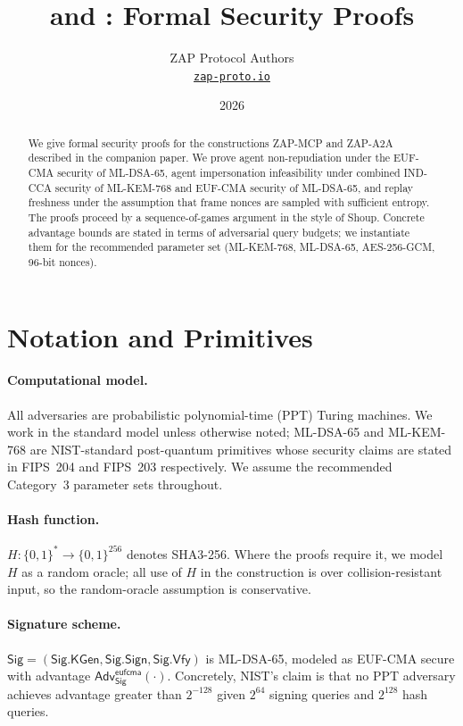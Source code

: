 \documentclass[11pt,a4paper]{article}
\title{\textbf{\zapmcp{} and \zapaa{}: Formal Security Proofs}}
\author{ZAP Protocol Authors\\
\href{https://zap-proto.io}{\texttt{zap-proto.io}}}
\date{2026}
\theoremstyle{definition}
\theoremstyle{remark}
\newcommand{\zapmcp}{\textsf{ZAP-MCP}\xspace}
\newcommand{\zapaa}{\textsf{ZAP-A2A}\xspace}
\newcommand{\Adv}{\mathsf{Adv}}
\newcommand{\Sign}{\textsf{Sig}}
\begin{document}
\maketitle

\begin{abstract}
We give formal security proofs for the constructions \zapmcp{} and
\zapaa{} described in the companion paper. We prove agent
non-repudiation under the EUF-CMA security of ML-DSA-65, agent
impersonation infeasibility under combined IND-CCA security of
ML-KEM-768 and EUF-CMA security of ML-DSA-65, and replay freshness
under the assumption that frame nonces are sampled with sufficient
entropy. The proofs proceed by a sequence-of-games argument in the
style of Shoup. Concrete advantage bounds are stated in terms of
adversarial query budgets; we instantiate them for the recommended
parameter set (ML-KEM-768, ML-DSA-65, AES-256-GCM, 96-bit nonces).
\end{abstract}

\section{Notation and Primitives}

\paragraph{Computational model.} All adversaries are probabilistic
polynomial-time (PPT) Turing machines. We work in the standard model
unless otherwise noted; ML-DSA-65 and ML-KEM-768 are NIST-standard
post-quantum primitives whose security claims are stated in
FIPS~204 and FIPS~203 respectively. We assume the recommended Category~3
parameter sets throughout.

\paragraph{Hash function.} $H : \{0,1\}^* \to \{0,1\}^{256}$ denotes
SHA3-256. Where the proofs require it, we model $H$ as a random oracle;
all use of $H$ in the construction is over collision-resistant input,
so the random-oracle assumption is conservative.

\paragraph{Signature scheme.} $\Sign = (\Sign.\mathsf{KGen},
\Sign.\mathsf{Sign}, \Sign.\mathsf{Vfy})$ is ML-DSA-65, modeled as
EUF-CMA secure with advantage
$\Adv^{\mathsf{eufcma}}_{\Sign}(\cdot)$. Concretely, NIST's claim is
that no PPT adversary achieves advantage greater than
$2^{-128}$ given $2^{64}$ signing queries and $2^{128}$ hash queries.
\end{document}
